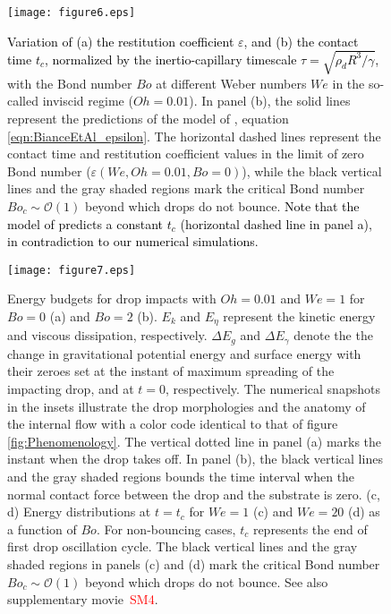 \documentclass{jfm}
\newcommand*\red{\textcolor{red}}
\newcommand{\Ohn}{\mathit{Oh}}
\newcommand{\Wen}{\mathit{We}}
\newcommand{\Bon}{\mathit{Bo}}
\newcommand{\Boc}{\mathit{Bo}_\mathit{c}}
\newcommand{\revRev}[1]{\textcolor{black}{#1}}
\begin{document}
\begin{figure}
	\centering
	\texttt{[image: figure6.eps]}
	\caption{\revRev{Variation of (a) the restitution coefficient $\varepsilon$, and (b) the contact time $t_c$, normalized by the inertio-capillary timescale $\tau = \sqrt{\rho_dR^3/\gamma}$,} with the Bond number $\Bon$ at different Weber numbers $\Wen$ in the so-called inviscid regime ($\Ohn = 0.01$). In panel (b), the solid lines represent the predictions of the model of \citet{biance2006}, equation \eqref{eqn:BianceEtAl_epsilon}. The horizontal dashed lines represent the contact time and restitution coefficient values in the limit of zero Bond number ($\varepsilon\left(\Wen, \Ohn = 0.01, \Bon = 0\right)$), while the black vertical lines and the gray shaded regions mark the critical Bond number $\Boc \sim \mathcal{O}\left(1\right)$ beyond which drops do not bounce. \revRev{Note that the model of \citet{biance2006} predicts a constant $t_c$ (horizontal dashed line in panel a), in contradiction to our numerical simulations.}}
	\label{fig:Bolim}
\end{figure}
\begin{figure}
	\centering
	\texttt{[image: figure7.eps]}
	\caption{Energy budgets for drop impacts with $\Ohn = 0.01$ and $\Wen = 1$ for $\Bon = 0$ (a) and $\Bon = 2$ (b). $E_k$ and $E_\eta$ represent the kinetic energy and viscous dissipation, respectively. $\Delta E_g$ and $\Delta E_\gamma$ denote the the change in gravitational potential energy and surface energy with their zeroes set at the instant of maximum spreading of the impacting drop, and at $t = 0$, respectively. 
	The numerical snapshots in the insets illustrate the drop morphologies and the anatomy of the internal flow with a color code identical to that of figure \ref{fig:Phenomenology}.
	The vertical dotted line in panel (a) marks the instant when the drop takes off. In panel (b), the black vertical lines and the gray shaded regions bounds the time interval when the normal contact force between the drop and the substrate is zero. (c, d) Energy distributions at $t = t_c$ for $\Wen = 1$ (c) and $\Wen = 20$ (d) as a function of $\Bon$. For non-bouncing cases, $t_c$ represents the end of first drop oscillation cycle.
	The black vertical lines and the gray shaded regions in panels (c) and (d) mark the critical Bond number $\Boc \sim \mathcal{O}\left(1\right)$ beyond which drops do not bounce. See also supplementary movie~\red{SM4}.}
	\label{fig:BolimDescription}
\end{figure}
\end{document}
